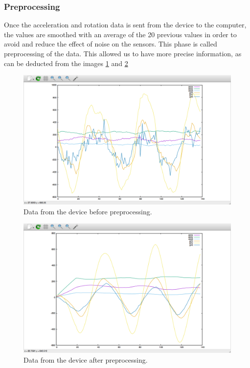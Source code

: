 \subsubsection{Preprocessing}
Once the acceleration and rotation data is sent from the device to the computer,
 the values are smoothed with an average of the 20 previous values in order to avoid and reduce the effect of noise on the sensors.
 This phase is called preprocessing of the data. 
 This allowed us to have more precise information, as can be deducted from the images  \ref{fig:figure2} and \ref{fig:figure3}

\begin{figure}[!h]
\centering
\includegraphics[width=0.9\columnwidth]{img/raw}
\caption{Data from the device before preprocessing.}
\label{fig:figure2}
\end{figure}

\begin{figure}[!h]
\centering
\includegraphics[width=0.9\columnwidth]{img/20}
\caption{Data from the device after preprocessing.}
\label{fig:figure3}
\end{figure}

